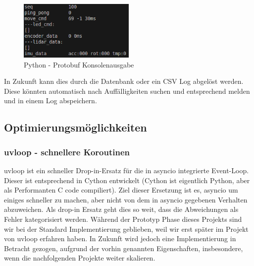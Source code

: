 \begin{figure}[H]
    \includegraphics[width=0.5\textwidth, center]{img/Backend/print_wrapper_all.png}
    \caption{Python - Protobuf Konsolenausgabe}
    \label{fig:py_konsole_o}
\end{figure}

In Zukunft kann dies durch die Datenbank oder ein CSV Log abgelöst werden.
% 
Diese könnten automatisch nach Auffälligkeiten suchen 
und entsprechend melden und in einem Log abspeichern.






\subsection{Optimierungsmöglichkeiten}
\label{subsec:Optimierungsmöglichkeiten}
\subsubsection{uvloop - schnellere Koroutinen}
uvloop ist ein schneller Drop-in-Ersatz für die in asyncio integrierte Event-Loop. 
Dieser ist entsprechend in Cython entwickelt 
(Cython ist eigentlich Python, aber als Performanten C code compiliert).
Ziel dieser Ersetzung ist es, asyncio um einiges schneller zu machen, 
aber nicht von dem in asyncio gegebenen Verhalten abzuweichen. 
Als drop-in Ersatz geht dies so weit, 
dass die Abweichungen als Fehler kategorisiert werden.
% 
Während der Prototyp Phase dieses Projekts 
sind wir bei der Standard Implementierung geblieben, 
weil wir erst später im Projekt von uvloop erfahren haben.
In Zukunft wird jedoch eine Implementierung in Betracht gezogen,
aufgrund der vorhin genannten Eigenschaften,
insbesondere, wenn die nachfolgenden Projekte weiter skalieren.

